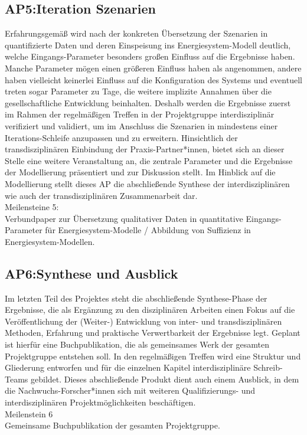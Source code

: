\documentclass[a4paper,11pt,twoside]{scrartcl}
\begin{document}
\subsection*{AP5:Iteration Szenarien}
Erfahrungsgemäß wird nach der konkreten Übersetzung der Szenarien in quantifizierte Daten und deren Einspeisung ins Energiesystem-Modell deutlich, welche Eingangs-Parameter besonders großen Einfluss auf die Ergebnisse haben. Manche Parameter mögen einen größeren Einfluss haben als angenommen, andere haben vielleicht keinerlei Einfluss auf die Konfiguration des Systems und eventuell treten sogar Parameter zu Tage, die weitere implizite Annahmen über die gesellschaftliche Entwicklung beinhalten. Deshalb werden die Ergebnisse zuerst im Rahmen der regelmäßigen Treffen in der Projektgruppe interdisziplinär verifiziert und validiert, um im Anschluss die Szenarien in mindestens einer Iterations-Schleife anzupassen und zu erweitern. Hinsichtlich der transdisziplinären Einbindung der Praxis-Partner*innen, bietet sich an dieser Stelle eine weitere Veranstaltung an, die zentrale Parameter und die Ergebnisse der Modellierung präsentiert und zur Diskussion stellt.
Im Hinblick auf die Modellierung stellt dieses AP die abschließende Synthese der interdisziplinären wie auch der transdisziplinären Zusammenarbeit dar.\\ 
Meilensteine 5: \\
Verbundpaper zur Übersetzung qualitativer Daten in quantitative Eingangs-Parameter für Energiesystem-Modelle / Abbildung von Suffizienz in Energiesystem-Modellen.

\subsection*{AP6:Synthese und Ausblick}
Im letzten Teil des Projektes steht die abschließende Synthese-Phase der Ergebnisse, die als Ergänzung zu den disziplinären Arbeiten einen Fokus auf die Veröffentlichung der (Weiter-) Entwicklung von inter- und transdisziplinären Methoden, Erfahrung und praktische Verwertbarkeit der Ergebnisse legt. Geplant ist hierfür eine Buchpublikation, die als gemeinsames Werk der gesamten Projektgruppe entstehen soll. In den regelmäßigen Treffen wird eine Struktur und Gliederung entworfen und für die einzelnen Kapitel interdisziplinäre Schreib-Teams gebildet. Dieses abschließende Produkt dient auch einem Ausblick, in dem die Nachwuchs-Forscher*innen sich mit weiteren Qualifizierungs- und interdisziplinären Projektmöglichkeiten beschäftigen.\\
Meilenstein 6\\
Gemeinsame Buchpublikation der gesamten Projektgruppe.
\end{document}
